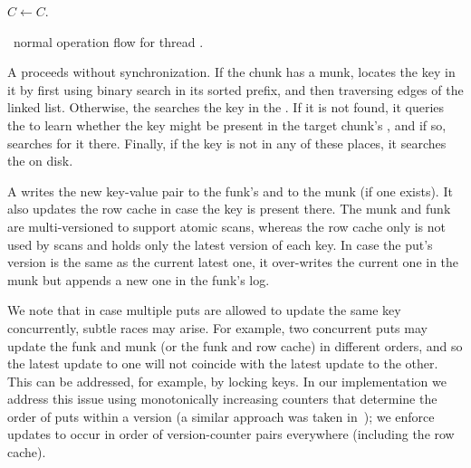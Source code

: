 \begin{algorithm}[tb]
\begin{algorithmic}[1]{}
			\State $C \leftarrow C$. 
\EndProcedure	
\end{algorithmic}
\caption{\sys\ normal operation flow for thread .}
\label{alg:ops}
\end{algorithm}


A 
 proceeds without synchronization. If the chunk has a munk,     locates the key in it by first using binary search in its sorted prefix, and then traversing edges of the linked list. 
Otherwise, the  searches the key in the . If it is not found, it queries 
the  to learn whether the key might be present in the target chunk's  
 , and if so, searches for it there.  Finally, if the key is not in any of these places, it searches
 the     on disk.


A   writes the new key-value pair to the  funk's  and to the 
munk (if one exists). 
It also updates the row cache in case the key is present there. 
The munk and funk are multi-versioned to support atomic scans, 
whereas the row cache only is not used by scans and holds only the latest version of each key. 
In case the put's version is the same as the current latest one, it over-writes the current one in the munk
but appends a new one in the funk's log. 

We note that in case multiple puts are allowed to update the same key concurrently, subtle races may arise. 
For example, two concurrent puts may update the funk and munk (or the funk and row cache) in  different orders,
and so the latest update to one will not coincide with the latest update to the other. 
This can be addressed, for example, by locking
keys. In our implementation we address this issue using monotonically increasing counters that determine 
the order of puts within a version (a similar approach was taken in~\cite{kiwi});  we  enforce 
updates to occur in order of version-counter pairs  everywhere (including the row cache).  

